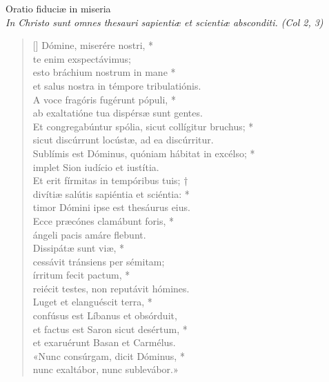 


\def\greinitialformat#1{%
{\fontsize{39}{39}\selectfont #1}%
}




\vspace{0.3cm}
\begin{center}


Oratio fiduciæ in miseria\\
\textit{\small In Christo sunt omnes thesauri sapientiæ et scientiæ absconditi. (Col 2, 3)}
\end{center}
\begin{verse}[\versewidth]
Dómine, miserére nostri, *\\
te enim exspectávimus;\\ 
\vin esto bráchium nostrum in mane *\\
\vin et salus nostra in témpore tribulatiónis.\\
A voce fragóris fugérunt pópuli, *\\
ab exaltatióne tua dispérsæ sunt gentes.\\
\vin Et congregabúntur spólia, sicut collígitur bruchus; *\\
\vin sicut discúrrunt locústæ, ad ea discúrritur.\\
Sublímis est Dóminus, quóniam hábitat in excélso; *\\
implet Sion iudício et iustítia.\\
\vin Et erit fírmitas in tempóribus tuis; †\\
\vin divítiæ salútis sapiéntia et sciéntia: *\\
\vin timor Dómini ipse est thesáurus eius.\\
Ecce præcónes clamábunt foris, *\\
ángeli pacis amáre flebunt.\\
\vin Dissipátæ sunt viæ, *\\
\vin cessávit tránsiens per sémitam;\\ 
írritum fecit pactum, *\\
reiécit testes, non reputávit hómines.\\
\vin Luget et elanguéscit terra, *\\
\vin confúsus est Líbanus et obsórduit,\\ 
et factus est Saron sicut desértum, *\\
et exaruérunt Basan et Carmélus.\\
\vin «Nunc consúrgam, dicit Dóminus, *\\
\vin nunc exaltábor, nunc sublevábor.»\\



\end{verse}

